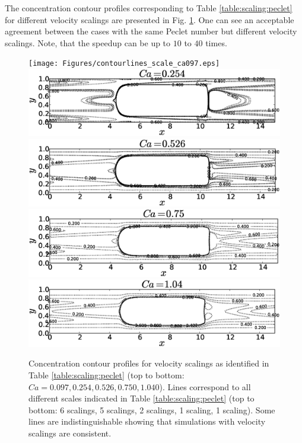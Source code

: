 \documentclass[preprint,12pt]{elsarticle}
\begin{document}
The concentration contour profiles corresponding to Table \ref{table:scaling:peclet} for different
velocity scalings are presented in Fig. \ref{fig:contours:scaling:peclet}. One can see an
acceptable agreement between the cases with the same Peclet number but different velocity scalings. Note, that the speedup can be up to $10$ to $40$ times.
\begin{figure}[htb!]
\texttt{[image: Figures/contourlines\_scale\_ca097.eps]}\\
\includegraphics[height=0.25\textwidth]{Figures/contourlines_scale_ca054.eps}\\
\includegraphics[height=0.25\textwidth]{Figures/contourlines_scale_ca026.eps}\\
\includegraphics[height=0.25\textwidth]{Figures/contourlines_scale_ca05.eps}\\
\includegraphics[height=0.25\textwidth]{Figures/contourlines_scale_ca14.eps}\\
\caption{Concentration contour profiles for velocity scalings as identified in Table
\ref{table:scaling:peclet} (top to bottom:
$Ca=0.097,0.254,0.526,0.750,1.040$). Lines correspond to
all different scales indicated in Table
\ref{table:scaling:peclet} (top to bottom: 6 scalings, 5 scalings, 2 scalings, 1 scaling, 1 scaling). Some lines are indistinguishable showing that simulations with velocity scalings are consistent.  \label{fig:contours:scaling:peclet}}
\end{figure}
\end{document}
